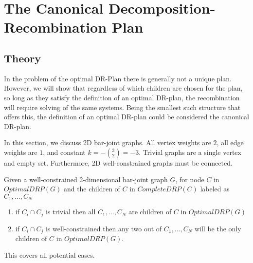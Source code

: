 \section{The Canonical Decomposition-Recombination Plan}
\label{sec:DRP}

\newcommand{\usestwod}{\todo{Uses 2D requirement:}}
\renewcommand{\usestwod}{}

\subsection{Theory}

In the problem of the optimal DR-Plan there is generally not a unique plan.
However, we will show that regardless of which children are chosen for the plan, so long as they satisfy the definition of an optimal DR-plan, the recombination will require solving of the same systems. Being the smallest such structure that offers this, the definition of an optimal DR-plan could be considered the canonical DR-plan.

In this section, we discuss 2D bar-joint graphs. All vertex weights are $2$, all edge weights are $1$, and constant $k= -{{3}\choose{2}}=-3$. Trivial graphs are a single vertex and empty set. Furthermore, 2D well-constrained graphs must be connected.



\begin{theorem}\label{theorem:main}
Given a well-constrained 2-dimensional bar-joint graph $G$, for node $C$ in $OptimalDRP(G)$ and the children of $C$ in $CompleteDRP(C)$ labeled as $C_1,\ldots,C_N$
\begin{enumerate}
    \item if $C_i \cap C_j$ is trivial then all $C_1,\ldots,C_N$ are children of $C$ in $OptimalDRP(G)$
    \item if $C_i \cap C_j$ is well-constrained then any two out of $C_1,\ldots,C_N$ will be the only children of $C$ in $OptimalDRP(G)$.
\end{enumerate}
This covers all potential cases.
\end{theorem}

